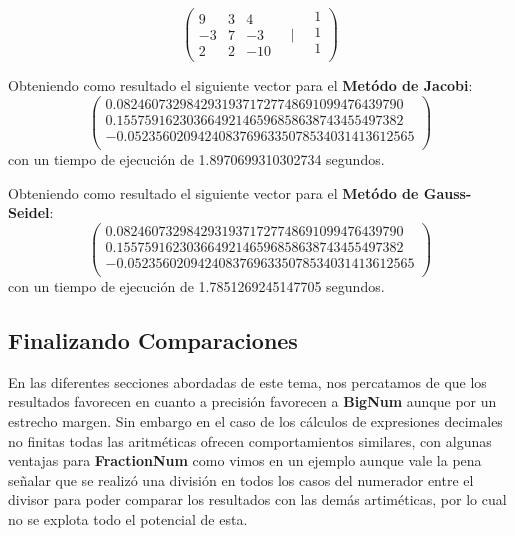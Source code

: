 \documentclass[a4paper,10pt,twocolumn]{article}
\begin{document}
	\begin{equation}	
		\left(	
		\begin{matrix}
			9  &  3  &  4\\
            	-3 &  7  & -3\\
            	2  &  2  &-10 
		\end{matrix}
		\quad\Bigg|\quad
		\begin{matrix}
			1\\
			1\\
			1\\
		\end{matrix}
		\right)
	\end{equation}
	
	Obteniendo como resultado el siguiente vector para el \textbf{Metódo de Jacobi}:
	$$	
		\left(	
		\begin{matrix}
			0.08246073298429319371727748691099476439790\\ 								0.15575916230366492146596858638743455497382\\ 								-0.05235602094240837696335078534031413612565\\
		\end{matrix}
		\right)
	$$ con un tiempo de ejecución de 1.8970699310302734 segundos.
	
	Obteniendo como resultado el siguiente vector para el \textbf{Metódo de Gauss-Seidel}:
	$$	
		\left(	
		\begin{matrix}
			0.08246073298429319371727748691099476439790\\ 								0.15575916230366492146596858638743455497382\\ 								-0.05235602094240837696335078534031413612565\\
		\end{matrix}
		\right)
	$$ con un tiempo de ejecución de 1.7851269245147705 segundos.
	
\subsection{Finalizando Comparaciones}\label{sub:big}
	En las diferentes secciones abordadas de este tema, nos percatamos de que los resultados favorecen en cuanto a precisión favorecen a \textbf{BigNum} aunque por un estrecho margen. Sin embargo en el caso de los cálculos de expresiones decimales no finitas todas las aritméticas ofrecen comportamientos similares, con algunas ventajas para \textbf{FractionNum} como vimos en un ejemplo aunque vale la pena señalar que se realizó una división en todos los casos del numerador entre el divisor para poder comparar los resultados con las demás artiméticas, por lo cual no se explota todo el potencial de esta.
	
\end{document}
